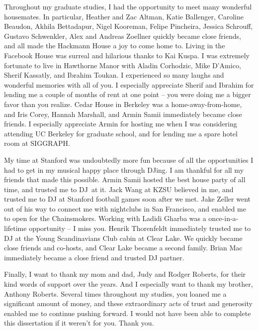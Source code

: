 Throughout my graduate studies, I had the opportunity to meet many wonderful housemates.
In particular, Heather and Zac Altman, Katie Ballenger, Caroline Beaudon, Akhila Bettadapur, Nigel Kooreman, Felipe Pincheira, Jessica Schrouff, Gustavo Schwenkler, Alex and Andreas Zoellner quickly became close friends, and all made the Hackmann House a joy to come home to.
Living in the Facebook House was surreal and hilarious thanks to Kai Kuspa.
I was extremely fortunate to live in Hawthorne Manor with  Aladin Corhodzic, Mike D'Amico, Sherif Kassatly, and Ibrahim Toukan.
I experienced so many laughs and wonderful memories with all of you.
I especially appreciate Sherif and Ibrahim for lending me a couple of months of rent at one point -- you were doing me a bigger favor than you realize.
Cedar House in Berkeley was a home-away-from-home, and Iris Corey, Hannah Marshall, and Armin Samii immediately became close friends.
I especially appreciate Armin for hosting me when I was considering attending UC Berkeley for graduate school, and for lending me a spare hotel room at SIGGRAPH.

My time at Stanford was undoubtedly more fun because of all the opportunities I had to get in my musical happy place through DJing.
I am thankful for all my friends that made this possible.
Armin Samii hosted the best house party of all time, and trusted me to DJ\ at it.
Jack Wang at KZSU believed in me, and trusted me to DJ at Stanford football games soon after we met.
Jake Zeller went out of his way to connect me with nightclubs in San Francisco, and enabled me to open for the Chainsmokers.
Working with Ladidi Gharba was a once-in-a-lifetime opportunity -- I miss you.
Henrik Thorenfeldt immediately trusted me to DJ at the Young Scandinavians Club cabin at Clear Lake.
We quickly became close friends and co-hosts, and Clear Lake became a second family.
Brian Mac immediately became a close friend and trusted DJ partner.

Finally, I want to thank my mom and dad, Judy and Rodger Roberts, for their kind words of support over the years.
And I especially want to thank my brother, Anthony Roberts.
Several times throughout my studies, you loaned me a significant amount of money, and these extraordinary acts of trust and generosity enabled me to continue pushing forward.
I would not have been able to complete this dissertation if it weren't for you.
Thank you.
